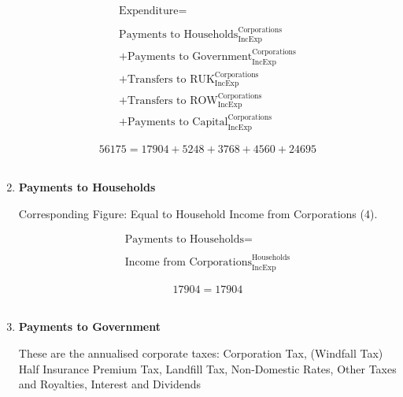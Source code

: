 \begin{enumerate}
\begin{equation}
\begin{split}
\text{Expenditure} =  \\ \\
\text{Payments to Households}^\text{Corporations}_\text{IncExp}\\
+\text{Payments to Government}^\text{Corporations}_\text{IncExp}\\
+\text{Transfers to RUK}^\text{Corporations}_\text{IncExp}\\
+\text{Transfers to ROW}^\text{Corporations}_\text{IncExp}\\
+\text{Payments to Capital}^\text{Corporations}_\text{IncExp}
\end{split} \label{eq:2.5.28}
\end{equation}

\begin{equation} \nonumber
56175 = 17904+5248+3768+4560+24695
\end{equation}\\


\item \textbf {Payments to Households}

Corresponding Figure: Equal to Household Income from Corporations (4).

\begin{equation}
\begin{split}
\text{Payments to Households} =  \\ \\
\text{Income from Corporations}^\text{Households}_\text{IncExp}
\end{split} \label{eq:2.5.29}
\end{equation}

\begin{equation} \nonumber
17904 = 17904
\end{equation}\\


\item \textbf {Payments to Government}

These are the annualised corporate taxes: Corporation Tax, (Windfall Tax) Half Insurance Premium Tax, Landfill Tax, Non-Domestic Rates, Other Taxes and Royalties, Interest and Dividends \cite{ScotGov2013b}


\end{enumerate}
